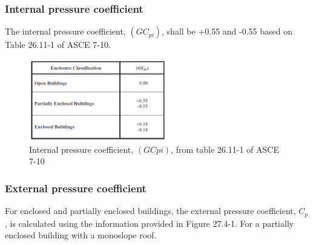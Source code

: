 \documentclass[a4paper,11pt]{xc_memo}
\begin{document}
\subsubsection{Internal pressure coefficient}
The internal pressure coefficient, $(GC_{pi})$, shall be +0.55 and -0.55 based on Table 26.11-1 of ASCE 7-10.

\begin{figure}
  \begin{center}
  \includegraphics[width= 60mm]{internal_pressure_coefficients_for_wall_surfaces}
  \end{center}
  \caption{Internal pressure coefficient, $(GCpi)$, from table 26.11-1 of ASCE 7-10}
\end{figure}

\subsubsection{External pressure coefficient}
For enclosed and partially enclosed buildings, the external pressure coefficient, $C_p$, is calculated using the information provided in Figure 27.4-1. For a partially enclosed building with a monoslope roof.
\end{document}
